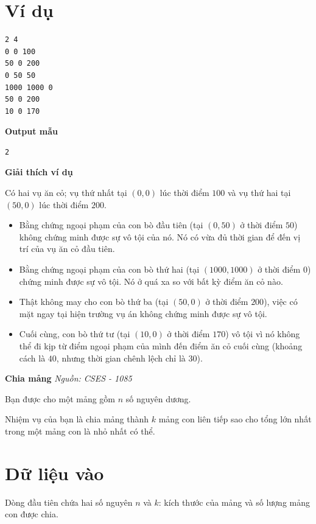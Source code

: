 \documentclass[12pt,a4paper]{article}
\newcommand{\problem}[2]{%
  \addcontentsline{toc}{section}{#1}%
  \begin{mdframed}[
    linecolor=framecolor,
    linewidth=1.5pt,
    backgroundcolor=white,
    topline=true, bottomline=true,
    leftline=true, rightline=true,
    innerleftmargin=10pt, innerrightmargin=10pt,
    innertopmargin=6pt, innerbottommargin=6pt,
  ]
  \textbf{\large #1} \hfill \textit{Nguồn: #2}
  \end{mdframed}
  \vspace{4pt}%
}
\newcommand{\explanation}{%
  \vspace{6pt}\textbf{\textcolor{sectioncolor}{Giải thích ví dụ}}\par\vspace{2pt}%
}
\begin{document}
\section*{Ví dụ}
\begin{lstlisting}
2 4
0 0 100
50 0 200
0 50 50
1000 1000 0
50 0 200
10 0 170
\end{lstlisting}

\textbf{\textcolor{sectioncolor}{Output mẫu}}
\begin{lstlisting}
2
\end{lstlisting}

\explanation
Có hai vụ ăn cỏ; vụ thứ nhất tại $(0, 0)$ lúc thời điểm $100$ và vụ thứ hai tại $(50, 0)$ lúc thời điểm $200$.

\begin{itemize}[leftmargin=*]
    \item Bằng chứng ngoại phạm của con bò đầu tiên (tại $(0, 50)$ ở thời điểm $50$) không chứng minh được sự vô tội của nó. Nó có vừa đủ thời gian để đến vị trí của vụ ăn cỏ đầu tiên.
    \item Bằng chứng ngoại phạm của con bò thứ hai (tại $(1000, 1000)$ ở thời điểm $0$) chứng minh được sự vô tội. Nó ở quá xa so với bất kỳ điểm ăn cỏ nào.
    \item Thật không may cho con bò thứ ba (tại $(50, 0)$ ở thời điểm $200$), việc có mặt ngay tại hiện trường vụ án không chứng minh được sự vô tội.
    \item Cuối cùng, con bò thứ tư (tại $(10, 0)$ ở thời điểm $170$) vô tội vì nó không thể đi kịp từ điểm ngoại phạm của mình đến điểm ăn cỏ cuối cùng (khoảng cách là $40$, nhưng thời gian chênh lệch chỉ là $30$).
\end{itemize}


\newpage







\problem{Chia mảng}{CSES - 1085}

Bạn được cho một mảng gồm $n$ số nguyên dương.

Nhiệm vụ của bạn là chia mảng thành $k$ mảng con liên tiếp sao cho tổng lớn nhất trong một mảng con là nhỏ nhất có thể.

\section*{Dữ liệu vào}
Dòng đầu tiên chứa hai số nguyên $n$ và $k$: kích thước của mảng và số lượng mảng con được chia.
\end{document}
